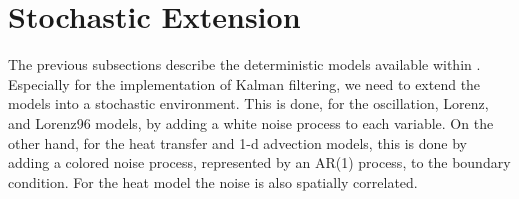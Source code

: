 \section{Stochastic Extension}
The previous subsections describe the deterministic models available within
\oda. Especially for the implementation of Kalman filtering, we need to extend
the models into a stochastic environment. This is done, for the oscillation,
Lorenz, and Lorenz96 models, by adding a white noise process to each variable.
On the other hand, for the heat transfer and 1-d advection models, this is done
by adding a colored noise process, represented by an AR(1) process, to the
boundary condition. For the heat model the noise is also spatially correlated.
